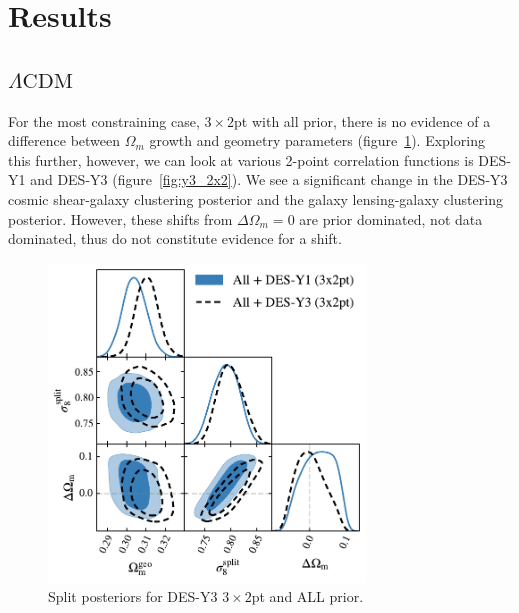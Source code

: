 \section{Results}
\subsection{\texorpdfstring{$\Lambda\text{CDM}$}{LCDM}}
For the most constraining case, $3\times2$pt with all prior, there is no evidence of a difference between $\Omega_m$ growth and geometry parameters (figure~\ref{fig:y3_3x2_all}). Exploring this further, however, we can look at various 2-point correlation functions is DES-Y1 and DES-Y3 (figure~\ref{fig:y3_2x2}). We see a significant change in the DES-Y3 cosmic shear-galaxy clustering posterior and the galaxy lensing-galaxy clustering posterior. However, these shifts from $\Delta\Omega_m=0$ are prior dominated, not data dominated, thus do not constitute evidence for a shift.
\begin{figure}[ht]
	\centering
	\includegraphics[width=0.75\textwidth]{plots/plot204_v2.pdf}
	\caption{Split posteriors for DES-Y3 $3\times2$pt and ALL prior.}
	\label{fig:y3_3x2_all}
\end{figure}
